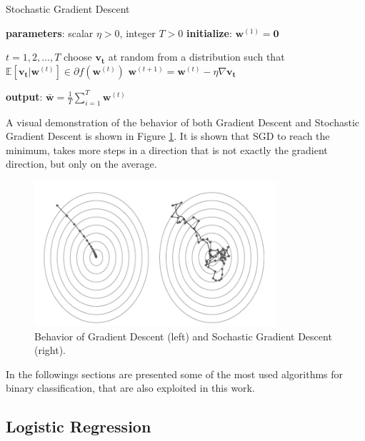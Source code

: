 \begin{algorithm}
	\caption{Stochastic Gradient Descent}\label{alg:SGD}
	\begin{algorithmic}[1]
		\State \textbf{parameters}: scalar $\eta > 0$, integer $T>0$
		\State \textbf{initialize}: $\mathbf{w}^{(1)} = \mathbf{0}$
		
		\For $t = 1, 2, \dots , T$
		\State choose $\mathbf{v_t}$ at random from a distribution such that $\mathbb{E}[\mathbf{v_t} | \mathbf{w}^{(t)}] \in \partial f(\mathbf{w}^{(t)})$
		\State $\mathbf{w}^{(t+1)} = \mathbf{w}^{(t)} - \eta \nabla \mathbf{v_t}$
		\EndFor
		
		\State \textbf{output}: $\mathbf{\bar{w}} = \frac{1}{T} \sum_{i=1}^{T} \mathbf{w}^{(t)}$
	\end{algorithmic}
\end{algorithm}

A visual demonstration of the behavior of both Gradient Descent and Stochastic Gradient Descent is shown in Figure \ref{fig:gd-sgd}. It is shown that SGD to reach the minimum, takes more steps in a direction that is not exactly the gradient direction, but only on the average.


\begin{figure}[ht]
	\centering
	\includegraphics[width=0.8\textwidth]{figures/gd-sgd.png}
	\caption{Behavior of Gradient Descent (left) and Sochastic Gradient Descent (right).}
	\label{fig:gd-sgd}
\end{figure}


In the followings sections are presented some of the most used algorithms for binary classification, that are also exploited in this work.


\subsection{Logistic Regression}

